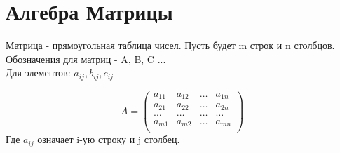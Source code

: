 \section{Алгебра Матрицы}
\begin{definition}
	Матрица - прямоугольная таблица чисел. Пусть будет m строк и n столбцов. \\
	Обозначения для матриц - A, B, C ... \\
	Для элементов: \(a_{ij}, b_{ij}, c_{ij}\)
\end{definition}
\[A = \begin{pmatrix}
	a_{11} & a_{12} & \ldots & a_{1n} \\
	a_{21} & a_{22} & \ldots & a_{2n} \\
	\ldots & \ldots & \ldots & \ldots \\
	a_{m1} & a_{m2} & \ldots & a_{mn} \\
\end{pmatrix}\]
Где \(a_{ij}\) означает i-ую строку и j столбец.
